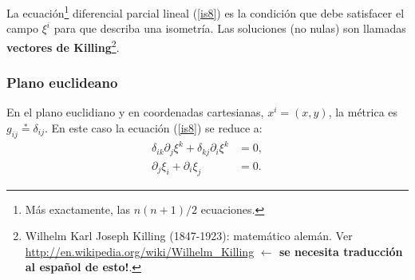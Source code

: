 La ecuación\footnote{Más exactamente, las $n(n+1)/2$ ecuaciones.} diferencial parcial lineal (\ref{is8}) es la condición que debe satisfacer el campo $\xi^i$ para que describa una isometría. Las soluciones (no nulas) son llamadas \textbf{vectores de Killing}\footnote{Wilhelm Karl Joseph Killing (1847-1923): matemático alemán. Ver \url{http://en.wikipedia.org/wiki/Wilhelm_Killing}  \textbf{$\leftarrow$ se necesita traducción al español de esto!}.}.

\subsubsection{Plano euclideano}

En el plano euclidiano y en coordenadas cartesianas, $x^i=(x,y)$, la
métrica es $g_{ij}\overset{\ast}{=}\delta_{ij}$.
%
En este caso la ecuación (\ref{is8}) se reduce a:
\begin{align}
\delta_{ik}\partial_j\xi^k+\delta_{kj}\partial_i\xi^k  &  =0,\label{isej1}\\
\partial_j\xi_i+\partial_i\xi_j  &  =0. \nonumber
\end{align}

